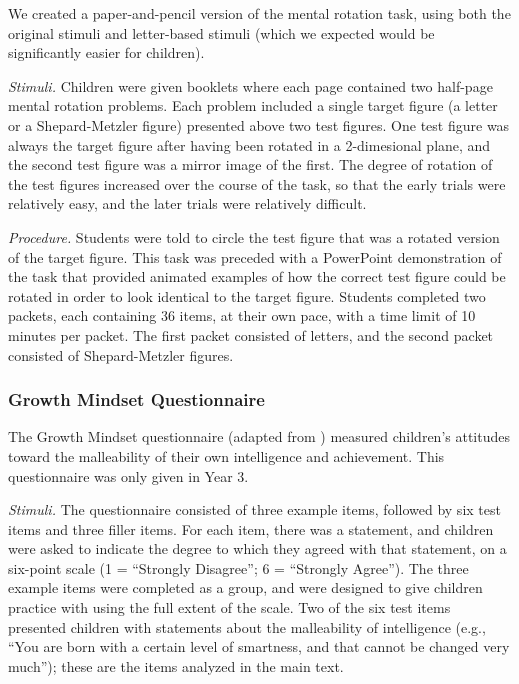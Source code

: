 \documentclass[11pt]{article}
\begin{document}
We created a paper-and-pencil version of the  mental rotation task, using both the original stimuli and letter-based stimuli (which we expected would be significantly easier for children). 

{\it Stimuli.} Children were given booklets where each page contained two half-page mental rotation problems. Each problem included a single target figure (a letter or a Shepard-Metzler figure) presented above two test figures. One test figure was always the target figure after having been rotated in a 2-dimesional plane, and the second test figure was a mirror image of the first. The degree of rotation of the test figures increased over the course of the task, so that the early trials were relatively easy, and the later trials were relatively difficult.

{\it Procedure.} Students were told to circle the test figure that was a rotated version of the target figure. This task was preceded with a PowerPoint demonstration of the task that provided animated examples of how the correct test figure could be rotated in order to look identical to the target figure. Students completed two packets, each containing 36 items, at their own pace, with a time limit of 10 minutes per packet. The first packet consisted of letters, and the second packet consisted of Shepard-Metzler figures.

\subsubsection{Growth Mindset Questionnaire} 

The Growth Mindset questionnaire (adapted from ) measured children's attitudes toward the malleability of their own intelligence and achievement. This questionnaire was only given in Year 3.

{\it Stimuli.} The questionnaire consisted of three example items, followed by six test items and three filler items. For each item, there was a statement, and children were asked to indicate the degree to which they agreed with that statement, on a six-point scale (1 = ``Strongly Disagree''; 6 = ``Strongly Agree''). The three example items were completed as a group, and were designed to give children practice with using the full extent of the scale. Two of the six test items presented children with statements about the malleability of intelligence (e.g., ``You are born with a certain level of smartness, and that cannot be changed very much''); these are the items analyzed in the main text.
\end{document}
